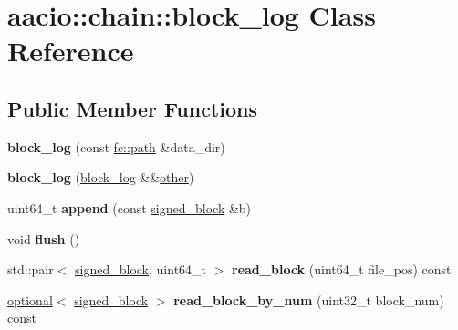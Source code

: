 \hypertarget{classaacio_1_1chain_1_1block__log}{}\section{aacio\+:\+:chain\+:\+:block\+\_\+log Class Reference}
\label{classaacio_1_1chain_1_1block__log}
\subsection*{Public Member Functions}
\begin{DoxyCompactItemize}
\item 
\mbox{\label{classaacio_1_1chain_1_1block__log_a103b2edfbff7917a6424ce40aee4b5ed}} 
{\bfseries block\+\_\+log} (const \mbox{\hyperlink{classfc_1_1path}{fc\+::path}} \&data\+\_\+dir)
\item 
\mbox{\label{classaacio_1_1chain_1_1block__log_a35d8e328049767b9117118e30bc3140e}} 
{\bfseries block\+\_\+log} (\mbox{\hyperlink{classaacio_1_1chain_1_1block__log}{block\+\_\+log}} \&\&\mbox{\hyperlink{structother}{other}})
\item 
\mbox{\label{classaacio_1_1chain_1_1block__log_a50ffcfe3ce85a488495467af779f7279}} 
uint64\+\_\+t {\bfseries append} (const \mbox{\hyperlink{structaacio_1_1chain_1_1signed__block}{signed\+\_\+block}} \&b)
\item 
\mbox{\label{classaacio_1_1chain_1_1block__log_a7cb0cc2c07d71398f31447d9fc5b1023}} 
void {\bfseries flush} ()
\item 
\mbox{\label{classaacio_1_1chain_1_1block__log_a3c78d636fc8019fe592e18b49e7c0263}} 
std\+::pair$<$ \mbox{\hyperlink{structaacio_1_1chain_1_1signed__block}{signed\+\_\+block}}, uint64\+\_\+t $>$ {\bfseries read\+\_\+block} (uint64\+\_\+t file\+\_\+pos) const
\item 
\mbox{\label{classaacio_1_1chain_1_1block__log_a4c71b65517f091bed4f90bba5786a87a}} 
\mbox{\hyperlink{classfc_1_1optional}{optional}}$<$ \mbox{\hyperlink{structaacio_1_1chain_1_1signed__block}{signed\+\_\+block}} $>$ {\bfseries read\+\_\+block\+\_\+by\+\_\+num} (uint32\+\_\+t block\+\_\+num) const

\end{DoxyCompactItemize}
